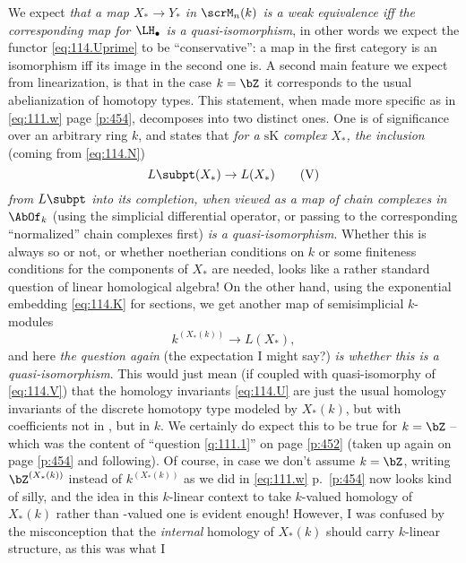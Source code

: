 We expect \emph{that a map $X_*\to Y_*$ in $\scrM_n(k)$ is a weak
  equivalence if{f} the corresponding map for $\LH_\bullet$ is a
  quasi-isomorphism}, in other words we expect the functor
\eqref{eq:114.Uprime} to be ``conservative'': a map in the first
category is an isomorphism if{f} its image in the second one is. A
second main feature we expect from linearization, is that in the case
$k=\bZ$ it corresponds to the usual abelianization of homotopy
types. This statement, when made more specific as in \eqref{eq:111.w}
page \ref{p:454}, decomposes into two distinct ones. One is of
significance over an arbitrary ring $k$, and states that \emph{for a
  $\mathrm{sK}$ complex $X_*$, the inclusion} (coming from
\eqref{eq:114.N})
\begin{equation}
  \label{eq:114.V}
  L\subpt(X_*)\to L(X_*)\tag{V}
\end{equation}
\emph{from $L\subpt$ into its completion, when viewed as a map of
  chain complexes in $\AbOf_k$} (using the simplicial differential
operator, or passing to the corresponding ``normalized'' chain
complexes first) \emph{is a quasi-isomorphism}. Whether this is always
so or not, or whether noetherian conditions on $k$ or some finiteness
conditions for the components of $X_*$ are needed, looks like a rather
standard question of linear homological algebra! On the other hand,
using the exponential embedding \eqref{eq:114.K} for sections, we get
another map of semisimplicial $k$-modules
\begin{equation}
  \label{eq:114.Vprime}
  k^{(X_*(k))} \to L(X_*),\tag{V'}
\end{equation}
and here \emph{the question again} (the expectation I might say?)
\emph{is whether this is a quasi-isomorphism}. This would just mean
(if coupled with quasi-isomorphy of \eqref{eq:114.V}) that the
homology invariants \eqref{eq:114.U} are just the usual homology
invariants of the discrete homotopy type modeled by $X_*(k)$, but with
coefficients not in \bZ, but in $k$. We certainly do expect this to be
true for $k=\bZ$ -- which was the content of ``question
\ref{q:111.1}'' on page \ref{p:452} (taken up again on
page \ref{p:454} and following). Of course, in case we don't assume
$k=\bZ$, writing $\bZ^{(X_*(k))}$ instead of $k^{(X_*(k))}$ as we did
in \eqref{eq:111.w} p.~\ref{p:454} now looks kind of silly, and the
idea in this $k$-linear context to take $k$-valued homology of
$X_*(k)$ rather than \bZ-valued one is evident enough! However, I was
confused by the misconception that the \emph{internal} homology of
$X_*(k)$ should carry $k$-linear structure, as this was what I
